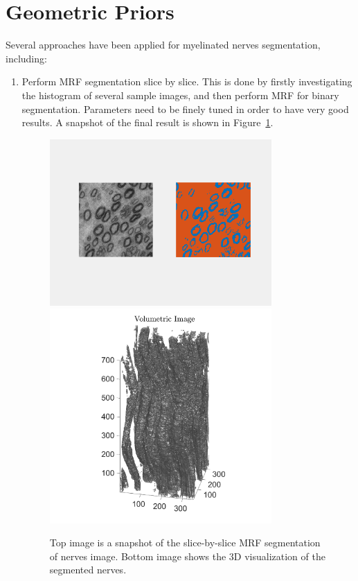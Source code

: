 \documentclass[a4paper]{article}
\begin{document}
	\section{Geometric Priors}
	Several approaches have been applied for myelinated nerves segmentation, including:
	\begin{enumerate}
	\item Perform MRF segmentation slice by slice. This is done by firstly investigating the histogram of several sample images, and then perform MRF for binary segmentation. Parameters need to be finely tuned in order to have very good results. A snapshot of the final result is shown in Figure~\ref{final1}.
	\begin{figure}[!b]
	\centering
	\includegraphics[width=0.8\textwidth]{./figures/1.png}
	\includegraphics[width=0.8\textwidth]{./figures/final_res1.png}
	\caption{Top image is a snapshot of the slice-by-slice MRF segmentation of nerves image. Bottom image shows the 3D visualization of the segmented nerves.}
	\label{final1}
\end{figure}
	

\end{enumerate}
\end{document}
